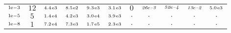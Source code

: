 \begin{tiny}
\begin{tabular}{@{$\;$}c@{$\;$}|@{$\;$}c@{$\;$}@{$\;$}c@{$\;$}@{$\;$}c@{$\;$}@{$\;$}c@{$\;$}@{$\;$}c@{$\;$}|@{$\;$}c@{$\;$}@{$\;$}c@{$\;$}@{$\;$}c@{$\;$}@{$\;$}c@{$\;$}@{$\;$}c@{$\;$}}
$\scriptstyle1\!\mathrm{\hspace{0.10em}e}-3$ & $\scriptstyle12$ & $\scriptstyle4.4\mathrm{\hspace{0.10em}e}3$ & $\scriptstyle8.5\mathrm{\hspace{0.10em}e}2$ & $\scriptstyle9.3\mathrm{\hspace{0.10em}e}3$ & $\scriptstyle3.1\mathrm{\hspace{0.10em}e}3$ & $\scriptstyle0$ & $\scriptstyle\textit{26}\hspace{0.00em}e\textit{--3}$ & $\scriptstyle\textit{52}\hspace{0.00em}e\textit{--4}$ & $\scriptstyle\textit{13}\hspace{0.00em}e\textit{--2}$ & $\scriptstyle5.0\mathrm{\hspace{0.10em}e}3$\\ 
$\scriptstyle1\!\mathrm{\hspace{0.10em}e}-5$ & $\scriptstyle5$ & $\scriptstyle1.4\mathrm{\hspace{0.10em}e}4$ & $\scriptstyle4.2\mathrm{\hspace{0.10em}e}3$ & $\scriptstyle3.0\mathrm{\hspace{0.10em}e}4$ & $\scriptstyle3.9\mathrm{\hspace{0.10em}e}3$ & $\scriptstyle.$ & $\scriptstyle.$ & $\scriptstyle.$ & $\scriptstyle.$ & $\scriptstyle.$\\ 
$\scriptstyle1\!\mathrm{\hspace{0.10em}e}-8$ & $\scriptstyle1$ & $\scriptstyle7.2\mathrm{\hspace{0.10em}e}4$ & $\scriptstyle7.3\mathrm{\hspace{0.10em}e}3$ & $\scriptstyle1.7\mathrm{\hspace{0.10em}e}5$ & $\scriptstyle2.3\mathrm{\hspace{0.10em}e}3$ & $\scriptstyle.$ & $\scriptstyle.$ & $\scriptstyle.$ & $\scriptstyle.$ & $\scriptstyle.$\\ 
\end{tabular} 
\end{tiny} 
